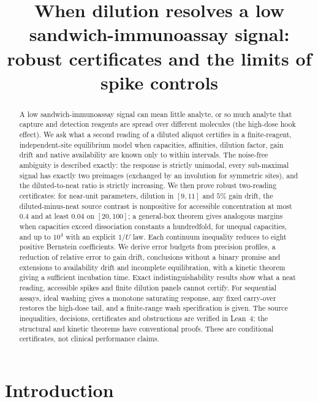 \documentclass[11pt]{article}
\title{When dilution resolves a low sandwich-immunoassay signal:\\
robust certificates and the limits of spike controls}
\author{}
\date{}
\theoremstyle{plain}
\theoremstyle{definition}
\numberwithin{equation}{section}
\begin{document}
\maketitle
\vspace{-3em}
\begin{abstract}
A low sandwich-immunoassay signal can mean little analyte, or so much analyte that
capture and detection reagents are spread over different molecules (the high-dose
hook effect). We ask what a second reading of a diluted aliquot certifies in a
finite-reagent, independent-site equilibrium model when capacities, affinities,
dilution factor, gain drift and native availability are known only to within
intervals. The noise-free ambiguity is described exactly: the response is strictly
unimodal, every sub-maximal signal has exactly two preimages (exchanged by an
involution for symmetric sites), and the diluted-to-neat ratio is strictly
increasing. We then prove robust two-reading certificates: for near-unit
parameters, dilution in $[9,11]$ and $5\%$ gain drift, the diluted-minus-neat source
contrast is nonpositive for accessible concentration at most $0.4$ and at least
$0.04$ on $[20,100]$; a general-box theorem gives analogous margins when capacities
exceed dissociation constants a hundredfold, for unequal capacities, and up to
$10^4$ with an explicit $1/U$ law. Each continuum inequality reduces to eight
positive Bernstein coefficients. We derive error budgets from precision profiles, a
reduction of relative error to gain drift, conclusions without a binary promise
and extensions to availability drift and incomplete equilibration, with a kinetic
theorem giving a sufficient incubation time. Exact indistinguishability results
show what a neat reading, accessible spikes and finite dilution panels cannot
certify. For sequential assays, ideal washing gives a monotone saturating response,
any fixed carry-over restores the high-dose tail, and a finite-range wash
specification is given. The source inequalities, decisions, certificates and
obstructions are verified in Lean~4; the structural and kinetic theorems have
conventional proofs. These are conditional certificates, not clinical
performance claims.
\end{abstract}

\section{Introduction}\label{sec:intro}
\end{document}
